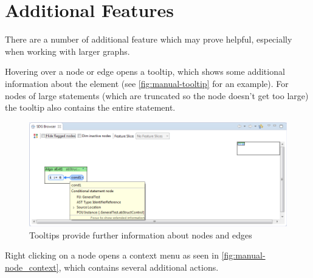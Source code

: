\section{Additional Features} \label{sec:manual-features}

There are a number of additional feature which may prove helpful, especially when working with larger graphs.

Hovering over a node or edge opens a tooltip, which shows some additional information about the element (see 
\autoref{fig:manual-tooltip} for an example). For nodes of large statements (which are truncated so the node doesn't 
get too large) the tooltip also contains the entire statement.

\begin{figure}[hp]
  \centering
    \includegraphics[width=\textwidth]{bilder/manual-tooltip}
  \caption{Tooltips provide further information about nodes and edges}
  \label{fig:manual-tooltip}
\end{figure}

Right clicking on a node opens a context menu as seen in \autoref{fig:manual-node_context}, which contains several 
additional actions.

